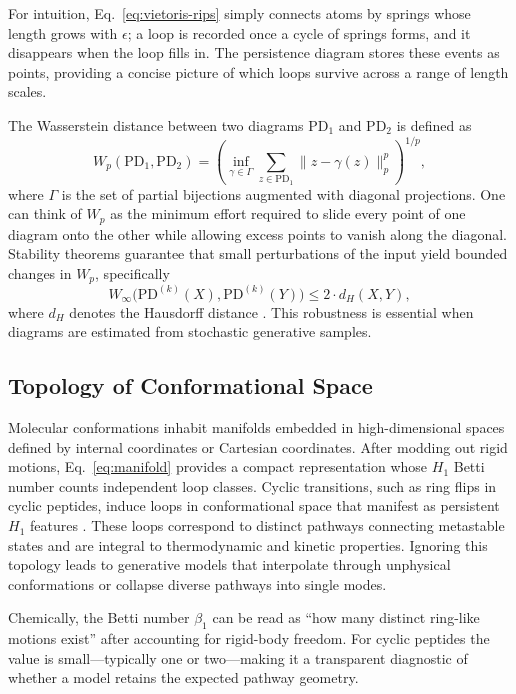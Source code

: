\documentclass[11pt]{article}
\theoremstyle{definition}
\begin{document}
For intuition, Eq.~\eqref{eq:vietoris-rips} simply connects atoms by springs whose length grows with $\epsilon$; a loop is recorded once a cycle of springs forms, and it disappears when the loop fills in. The persistence diagram stores these events as points, providing a concise picture of which loops survive across a range of length scales.

The Wasserstein distance between two diagrams $\mathrm{PD}_1$ and $\mathrm{PD}_2$ is defined as
\begin{equation}
    W_p(\mathrm{PD}_1, \mathrm{PD}_2) = \left( \inf_{\gamma \in \Gamma} \sum_{z \in \mathrm{PD}_1} \| z - \gamma(z) \|_p^p \right)^{1/p},
    \label{eq:wasserstein}
\end{equation}
where $\Gamma$ is the set of partial bijections augmented with diagonal projections. One can think of $W_p$ as the minimum effort required to slide every point of one diagram onto the other while allowing excess points to vanish along the diagonal. Stability theorems guarantee that small perturbations of the input yield bounded changes in $W_p$, specifically
\begin{equation}
    W_\infty\big( \mathrm{PD}^{(k)}(X), \mathrm{PD}^{(k)}(Y) \big) \leq 2 \cdot d_H(X, Y),
    \label{eq:stability}
\end{equation}
where $d_H$ denotes the Hausdorff distance \cite{cohen2007stability, chazal2016structure}. This robustness is essential when diagrams are estimated from stochastic generative samples.

\subsection{Topology of Conformational Space}
Molecular conformations inhabit manifolds embedded in high-dimensional spaces defined by internal coordinates or Cartesian coordinates. After modding out rigid motions, Eq.~\eqref{eq:manifold} provides a compact representation whose $H_1$ Betti number counts independent loop classes. Cyclic transitions, such as ring flips in cyclic peptides, induce loops in conformational space that manifest as persistent $H_1$ features \cite{wales2001microscopic, shaw2010atomic}. These loops correspond to distinct pathways connecting metastable states and are integral to thermodynamic and kinetic properties. Ignoring this topology leads to generative models that interpolate through unphysical conformations or collapse diverse pathways into single modes.

Chemically, the Betti number $\beta_1$ can be read as ``how many distinct ring-like motions exist'' after accounting for rigid-body freedom. For cyclic peptides the value is small---typically one or two---making it a transparent diagnostic of whether a model retains the expected pathway geometry.
\end{document}
